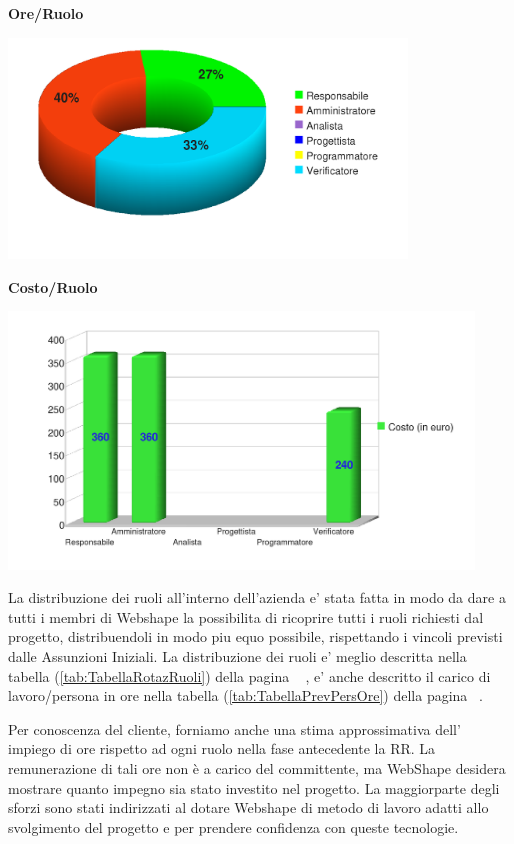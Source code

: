 \begin{center}\textbf{Ore/Ruolo}
\end{center}
\includegraphics[width=300pt]{RQ-RA_Ore}
\newpage
\begin{center}\textbf{Costo/Ruolo}
\end{center}
\includegraphics[width=350pt]{RQ-RA_Costi}

La distribuzione dei ruoli all'interno dell'azienda e' stata fatta in modo da dare a tutti i membri di Webshape la possibilita di ricoprire tutti i ruoli richiesti dal progetto, distribuendoli in modo piu equo possibile, rispettando i vincoli previsti dalle Assunzioni Iniziali. La distribuzione dei ruoli e' meglio descritta nella tabella (\ref{tab:TabellaRotazRuoli}) della pagina ~\pageref{tab:TabellaRotazRuoli} , e' anche descritto il carico di lavoro/persona in ore nella tabella (\ref{tab:TabellaPrevPersOre}) della pagina ~\pageref{tab:TabellaPrevPersOre}.

Per conoscenza del cliente, forniamo anche una stima approssimativa dell' impiego di ore rispetto ad ogni ruolo nella fase antecedente la RR. La remunerazione di tali ore non è a carico del committente, ma WebShape desidera mostrare quanto impegno sia stato investito nel progetto. La maggiorparte degli sforzi sono stati indirizzati al dotare Webshape di metodo di lavoro adatti allo svolgimento del progetto e per prendere confidenza con queste tecnologie.\\

